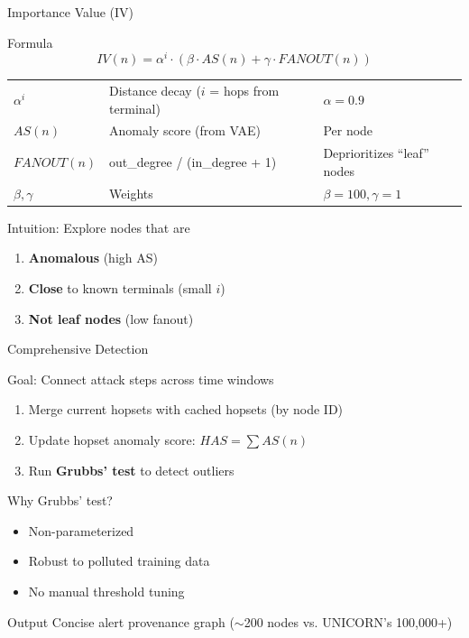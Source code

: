 \documentclass[11pt, aspectratio=169]{beamer}
\begin{document}
\begin{frame}{Importance Value (IV)}
    \begin{block}{Formula}
        \[
        IV(n) = \alpha^i \cdot (\beta \cdot AS(n) + \gamma \cdot FANOUT(n))
        \]
        \begin{table}
        \centering
        \begin{tabular}{lll}
            \toprule
            $\alpha^i$ & Distance decay ($i$ = hops from terminal) & $\alpha = 0.9$ \\
            $AS(n)$ & Anomaly score (from VAE) & Per node \\
            $FANOUT(n)$ & out\_degree / (in\_degree + 1) & Deprioritizes ``leaf'' nodes \\
            $\beta, \gamma$ & Weights & $\beta=100, \gamma=1$ \\
            \bottomrule
        \end{tabular}
        \end{table}
    \end{block}
    \begin{exampleblock}{Intuition: Explore nodes that are}
        \begin{enumerate}
            \item \textbf{Anomalous} (high AS)
            \item \textbf{Close} to known terminals (small $i$)
            \item \textbf{Not leaf nodes} (low fanout)
        \end{enumerate}
    \end{exampleblock}
\end{frame}

\begin{frame}{Comprehensive Detection}
    \begin{block}{Goal: Connect attack steps across time windows}
        \begin{enumerate}
            \item Merge current hopsets with cached hopsets (by node ID)
            \item Update hopset anomaly score: $HAS = \sum AS(n)$
            \item Run \textbf{Grubbs' test} to detect outliers
        \end{enumerate}
    \end{block}
    \begin{exampleblock}{Why Grubbs' test?}
        \begin{itemize}
            \item Non-parameterized
            \item Robust to polluted training data
            \item No manual threshold tuning
        \end{itemize}
    \end{exampleblock}
    \begin{block}{Output}
        Concise alert provenance graph ($\sim$200 nodes vs. UNICORN's 100,000+)
    \end{block}
\end{frame}
\end{document}
